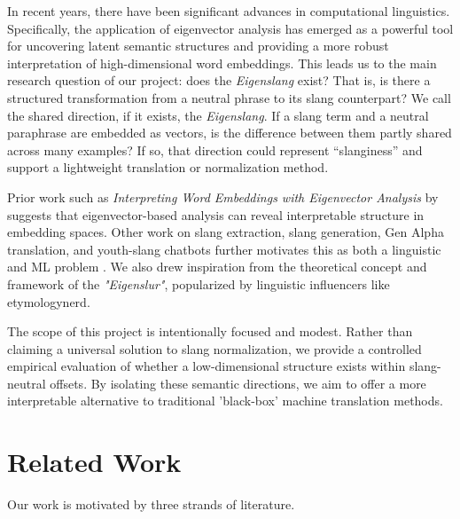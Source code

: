 \documentclass{article}
\begin{document}
In recent years, there have been significant advances in computational linguistics. Specifically, the application of eigenvector analysis has emerged as a powerful tool for uncovering latent semantic structures and providing a more robust interpretation of high-dimensional word embeddings. This leads us to the main research question of our project: does the \emph{Eigenslang} exist? That is, is there a structured transformation from a neutral phrase to its slang counterpart? We call the shared direction, if it exists, the \emph{Eigenslang}. If a slang term and a neutral paraphrase are embedded as vectors, is the difference between them partly shared across many examples? If so, that direction could represent ``slanginess'' and support a lightweight translation or normalization method.

Prior work such as \textit{Interpreting Word Embeddings with Eigenvector Analysis} by \citet{shin2018eigenvectors} suggests that eigenvector-based analysis can reveal interpretable structure in embedding spaces. Other work on slang extraction, slang generation, Gen Alpha translation, and youth-slang chatbots further motivates this as both a linguistic and ML problem \citep{ishita-mamidi-2025-evolution}. We also drew inspiration from the theoretical concept and framework of the \textit{"Eigenslur"}, popularized by linguistic influencers like 
etymologynerd.

The scope of this project is intentionally focused and modest. Rather than claiming a universal solution to slang normalization, we provide a controlled empirical evaluation of whether a low-dimensional structure exists within slang-neutral offsets. By isolating these semantic directions, we aim to offer a more interpretable alternative to traditional 'black-box' machine translation methods.



\section{Related Work}
Our work is motivated by three strands of literature.
\end{document}
